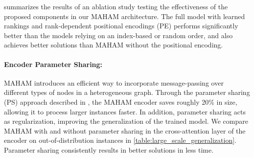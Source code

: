  summarizes the results of an ablation study testing the effectiveness of the proposed components in our MAHAM architecture. The full model with learned rankings and rank-dependent positional encodings (PE) performs significantly better than the models relying on an index-based or random order, and also achieves better solutions than MAHAM without the positional encoding.

\paragraph{Encoder Parameter Sharing:} MAHAM introduces an efficient way to incorporate message-passing over different types of nodes in a heterogeneous graph. Through the parameter sharing (PS) approach described in , the MAHAM encoder saves roughly 20\% in size, allowing it to process larger instances faster. In addition, parameter sharing acts as regularization, improving the generalization of the trained model. We compare MAHAM with and without parameter sharing in the cross-attention layer of the encoder on out-of-distribution instances in \cref{table:large_scale_generalization}. Parameter sharing consistently results in better solutions in less time.  

